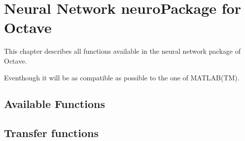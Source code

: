 \chapter{Neural Network neuroPackage for Octave}
This chapter describes all functions available in the neural network package of Octave.

Eventhough it will be as compatible as possible to the one of MATLAB(TM).

\section{Available Functions}











\section{Transfer functions}




